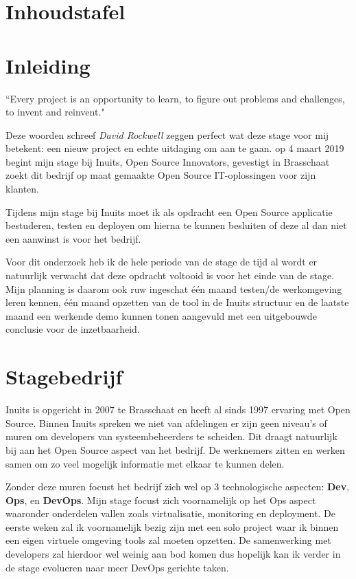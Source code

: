 \documentclass[a4paper]{article}
\def\blankpage{%
  \clearpage%
  \thispagestyle{empty}%
  \addtocounter{page}{-1}%
  \null%
\clearpage}
\begin{document}

\newpage
\blankpage
{}
\renewcommand{\contentsname}{}
\makeatletter
\renewcommand*\l@section{\@dottedtocline{1}{1.5em}{2.3em}}
\makeatother
\section*{Inhoudstafel}
\tableofcontents{}
\newpage{}

\section*{Inleiding}
%
\begin{center}
``Every project is an opportunity to learn, to figure out problems and challenges, to invent and reinvent."
\end{center}
Deze woorden schreef \textit{David Rockwell} zeggen perfect wat deze stage voor mij betekent: een nieuw project en echte uitdaging om aan te gaan.
op 4 maart 2019 begint mijn stage bij Inuits, Open Source Innovators, gevestigt in Brasschaat zoekt dit bedrijf op maat gemaakte Open Source IT-oplossingen voor zijn klanten.
\par
Tijdens mijn stage bij Inuits moet ik als opdracht een Open Source applicatie bestuderen, testen en deployen om hierna te kunnen besluiten of deze al dan niet een aanwinst is voor het bedrijf.
\par
Voor dit onderzoek heb ik de hele periode van de stage de tijd al wordt er natuurlijk verwacht dat deze opdracht voltooid is voor het einde van de stage.
Mijn planning is daarom ook ruw ingeschat één maand testen/de werkomgeving leren kennen, één maand opzetten van de tool in de Inuits structuur en de laatste maand een werkende demo kunnen tonen aangevuld met een uitgebouwde conclusie voor de inzetbaarheid.


\newpage{}
\section{Stagebedrijf}
Inuits is opgericht in 2007 te Brasschaat en heeft al sinds 1997 ervaring met Open Source.
Binnen Inuits spreken we niet van afdelingen er zijn geen niveau's of muren om developers van systeembeheerders te scheiden.
Dit draagt natuurlijk bij aan het Open Source aspect van het bedrijf.
De werknemers zitten en werken samen om zo veel mogelijk informatie met elkaar te kunnen delen.
\par
Zonder deze muren focust het bedrijf zich wel op 3 technologische aspecten: \textbf{Dev}, \textbf{Ops}, en \textbf{DevOps}. Mijn stage focust zich voornamelijk op het Ops aspect waaronder onderdelen vallen zoals virtualisatie, monitoring en deployment. De eerste weken zal ik voornamelijk bezig zijn met een solo project waar ik binnen een eigen virtuele omgeving tools zal moeten opzetten. De samenwerking met developers zal hierdoor wel weinig aan bod komen dus hopelijk kan ik verder in de stage evolueren naar meer DevOps gerichte taken.
\end{document}

